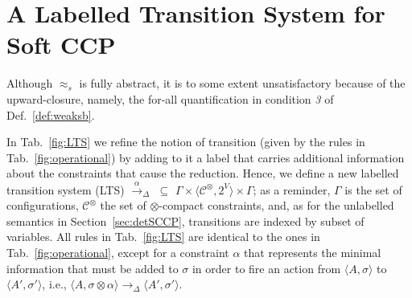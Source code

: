 \documentclass[main.tex]{subfiles}
\begin{document}
\section{A Labelled Transition System for Soft CCP}\label{sec:ltsSCCP}\label{sec:4}
Although $\approx_{\mathit{s}}$ is fully abstract, it is to some extent unsatisfactory
because of the upward-closure, namely, the for-all quantification in condition \emph{3} of Def.~\ref{def:weaksb}.

In Tab.~\ref{fig:LTS} we refine the notion of transition (given by the rules in Tab.~\ref{fig:operational})
by adding to it a label that carries additional information about the constraints that cause the reduction.
Hence, we define a new labelled transition system (LTS) $\xrightarrow{\;  \alpha \;}_\Delta \, \, \subseteq \, \,\Gamma \times \langle \mathcal{C}^\otimes, 2^V \rangle \times \Gamma$;
as a reminder, $\Gamma$ is the set of configurations, $\mathcal{C}^\otimes$ the set of $\otimes$-compact constraints, and,  as for the unlabelled semantics in Section~\ref{sec:detSCCP}, 
transitions are indexed by subset of variables.
All rules in Tab.~\ref{fig:LTS} are identical to the ones in Tab.~\ref{fig:operational}, except for a constraint $\alpha$ that
represents the minimal information that must be added to $\sigma$ in order to fire an action
from $\langle A, \sigma\rangle$  to $\langle A', \sigma' \rangle$, i.e., $\langle A, \sigma \otimes \alpha\rangle \longrightarrow_\Delta \langle A' , \sigma' \rangle$.


\end{document}
